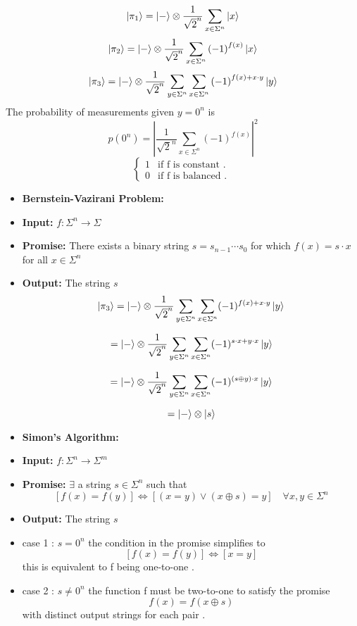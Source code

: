 \documentclass[12pt]{beamer}
\begin{document}
\begin{frame}
\[
\ket{\pi_1} = \ket{-} \otimes \frac{1}{\sqrt{2}^n}\sum_{x\in\Sigma^n}\ket{x}
\]
\[
\ket{\pi_2} = \ket{-} \otimes \frac{1}{\sqrt{2}^n}\sum_{x\in\Sigma^n}\left(-1\right)^{f(x)}\ket{x}
\]
\[
\ket{\pi_3} = \ket{-} \otimes \frac{1}{\sqrt{2}^n}\sum_{y\in\Sigma^n}\sum_{x\in\Sigma^n}\left(-1\right)^{f(x)+x\cdot y}\ket{y}
\]
The probability of measurements given $y=0^n$ is
\[
p(0^n)=\left|\frac{1}{\sqrt{2}^n}\sum_{x\in\Sigma^n}\left(-1\right)^{f(x)}\right|^2
\]
\[
\begin{cases}
    1 & \text{if f is constant . } \\
    0 & \text{if f is balanced . }
\end{cases}
\]
\end{frame}
\begin{frame}
\begin{itemize}
\item \textbf{Bernstein-Vazirani Problem:}
\item \textbf{Input:}
    $f : \Sigma^n \rightarrow \Sigma$
\item \textbf{Promise:}
    There exists a binary string $s = s_{n-1}\cdots s_0$ for which $f(x) = s \cdot x$ for all $x \in \Sigma^n$
\item \textbf{Output:}
    The string $s$
\[
\ket{\pi_3} = \ket{-} \otimes \frac{1}{\sqrt{2}^n}\sum_{y\in\Sigma^n}\sum_{x\in\Sigma^n} (-1)^{f(x) + x \cdot y}\ket{y} 
\]

\[
= \ket{-} \otimes \frac{1}{\sqrt{2}^n}\sum_{y\in\Sigma^n}\sum_{x\in\Sigma^n} (-1)^{s\cdot x + y\cdot x}\ket{y} 
\]

\[
= \ket{-} \otimes \frac{1}{\sqrt{2}^n}\sum_{y\in\Sigma^n}\sum_{x\in\Sigma^n} (-1)^{\left(s\oplus y\right)\cdot x}\ket{y} 
\]

\[
= \ket{-}\otimes\ket{s}
\]
\end{itemize}
\end{frame}
\begin{frame}
\begin{itemize}
\item \textbf{Simon's Algorithm:}
\item \textbf{Input:}
    $f : \Sigma^n \rightarrow \Sigma^m$
\item \textbf{Promise:}
   $\exists$ a string $s\in\Sigma^n$ such that
\[
\left[f(x)=f(y)\right] \Leftrightarrow \left[(x=y) \lor (x\oplus s)=y\right] \quad \forall x, y \in \Sigma^n
\]
\item \textbf{Output:} The string $s$
\item{case 1 :}
$s=0^n$
the condition in the promise simplifies to 
\[
\left[f(x)=f(y)\right] \Leftrightarrow \left[x=y\right]
\]
this is equivalent to f being one-to-one .
\item{case 2 :}
$s\neq0^n$
the function f must be two-to-one to satisfy the promise
\[
f(x)=f(x\oplus s)
\]
with distinct output strings for each pair .
\end{itemize}
\end{frame}
\end{document}
